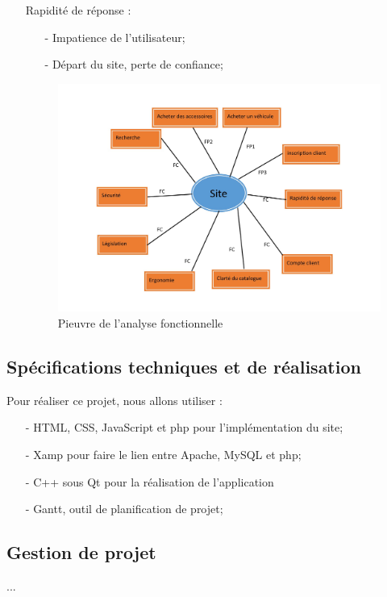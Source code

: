 \documentclass[a4paper]{article}
\begin{document}
\begin{itemize}
		\item[]{Rapidité de réponse :}
			\begin{itemize}
				\item[-] Impatience de l'utilisateur;
				\item[-] Départ du site, perte de confiance; 
			\end{itemize}
	\newpage
	\begin{figure}[h]
		\centering
			\includegraphics[scale=0.5]{../graph/pieuvre.jpg}
			\caption{Pieuvre de l'analyse fonctionnelle}
	\end{figure}
	\end{itemize}
	\subsection{Spécifications techniques et de réalisation}
	Pour réaliser ce projet, nous allons utiliser :
	\begin{itemize}
		\item[-] HTML, CSS, JavaScript et php pour l'implémentation du site;
		\item[-] Xamp pour faire le lien entre Apache, MySQL et php;
		\item[-] C++ sous Qt pour la réalisation de l'application
		\item[-] Gantt, outil de planification de projet;
	\end{itemize}

	\subsection{Gestion de projet}
	...
	
	\newpage
	\appendix
	\listoffigures
		
\end{document}
